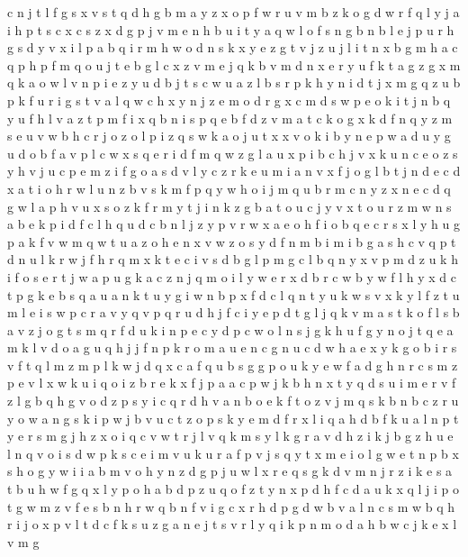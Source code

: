 \documentclass{article}
\begin{document}
c n j t l f g s x
v s t q d h g b m a y z x o p f w r u
v m b z k o g d w r f q l y j a i h p t s c x
c s z x d g p j v m e n h b u i t y a q w l o f
s n g b
n b l e j p u r h g s d y v x i
l p a b q i r m h w o d n s k x y e z g t v j
z u j l i t n x b g m h a c q p
h p f m q o u j t e b g l c
x z v m e j q k
b v m d n x e r y u f k t a g z
g x m q k a o w l v n p i e z y u d b j t s c
w u a z l b s r p k h y n i d t j x m g
q z u
b p k f u r i g s t v a l q w c h x y n j z e m o d
r g x c m d s w p e o k i t j n b q y u f h l v a z
t p m f i x q b
n i s p q e b f d z v m a t c k o g
x k d f n q y z m s e u v w b h c r j
o
z o
l p i z q s w k a o j u t x
x v o k i b y n e p w a d
u y
g u d o b f a v p l c w x s q e r i
d f m q w z g l a u x p i b c h j v
x k u n c e o z s y h v
j u c p e m z i f g o a s d v
l
y c z r k e u m i a n v x f j o g l b
t j
n d
e c d x a t i o h r w l u n z b v s k m f p q y
w h o i j m
q u b r m c n y z x
n e c d q g w l a p h v u x s o z k f r m y t j
i n k z g b a t o u
c
j y v x t o u r z m w n s a b e k p i d f c l h q
u d c b n l j z y p v r w x a e o h f
i o b q e c r s x l y h u g p a k f v w m
q w t u a z o h e n x v
w z o s y d f n m b i
m i b g a s h c v q p t d n u l k r
w j f h r q m x k t e c i v s
d b g l p m
g c l b q n y x v p m d z u k h i f o s e r t j w a
p u g k a c z n j q m o i l y w e r x d b
r c w b y
w f l h y x d c t p g k e b s q a u
a n k t u y g i
w n
b p x f d c l q n t y u k w s
v x k y l
f z t u m l e i s w p c r a v y q
v p q r u d h j f
c i y e p d t g l j q k v m a s
t k o f l s b
a v z j o g t s m q r f d u k i n p e c y
d p c w o l n s j g k h
u f g y n o j t q e a
m k l v d o a g u q h j
j f n p k r o
m a u e n c g
n u c d w h a e x y k g o b i r s v f t q l m z
m p l k w j d q x c
a f q u b s g
g p o u k y e w
f a d g h n r c s m z p e v l x w k u i q o
i z b r e k x f j p a
a c p w j k b h n x t y q d s u i m e r v f z l g
b q h
g v o d z
p s y i c q r d h v a n b o e k f
t o z v j m q s k b n
b c z r u y o w a n g s k
i p
w j b v u c t z o p s k y e m d f r x l i q a h
d b f k u a l n p t y e r s m g j h z x o i q c v w
t r j l v q k m
s y l k g r a v d h z i
k j b g z h u e l n q v o i s d w p
k s c e i m v u
k u
r a f p v j s q y t x m e i o l
g w
e t n p b x s h o g y w i
i a b m v o h y n z d g p j u w l x r e q s
g k
d v m n j r z i k e s a t b u h w f g q x l y p o
h a b d p z u q o f
z t y n x p d h f
c d a u k x q l j i p o t g w m z v f e s b n h r
w q b n f v i g c x
r h d
p g d w b v a l n c s
m w b q h r i j o x p v l t d c f k s u z g a n e
j t s v r l y q i k p n m
o d a h b w c j k e x l v m g
\end{document}

